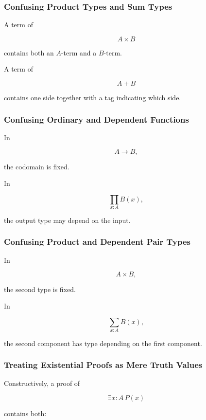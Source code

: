 \subsubsection{Confusing Product Types and Sum Types}

A term of

\[
A\times B
\]

contains both an \(A\)-term and a \(B\)-term.

A term of

\[
A+B
\]

contains one side together with a tag indicating which side.

\subsubsection{Confusing Ordinary and Dependent Functions}

In

\[
A\to B,
\]

the codomain is fixed.

In

\[
\prod_{x:A}B(x),
\]

the output type may depend on the input.

\subsubsection{Confusing Product and Dependent Pair Types}

In

\[
A\times B,
\]

the second type is fixed.

In

\[
\sum_{x:A}B(x),
\]

the second component has type depending on the first component.

\subsubsection{Treating Existential Proofs as Mere Truth Values}

Constructively, a proof of

\[
\exists x:A\,P(x)
\]

contains both:

